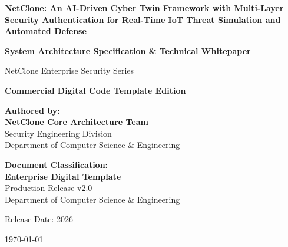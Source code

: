 \documentclass[12pt,a4paper]{report}
\begin{document}
\begin{titlepage}
    \centering
    \vspace*{0.5cm}
    
    {\Huge \textbf{NetClone: An AI-Driven Cyber Twin Framework with Multi-Layer Security Authentication for Real-Time IoT Threat Simulation and Automated Defense}}\par
    \vspace{1.2cm}
    
    {\Large \textbf{System Architecture Specification \& Technical Whitepaper}}\par
    \vspace{0.4cm}
    {\large NetClone Enterprise Security Series}\par
    {\large \textbf{Commercial Digital Code Template Edition}}\par
    \vspace{1.8cm}
    
    \begin{minipage}{0.48\textwidth}
        \begin{flushleft} \large
            \textbf{Authored by:}\\
            \textbf{NetClone Core Architecture Team}\\
            Security Engineering Division\\
            Department of Computer Science \& Engineering
        \end{flushleft}
    \end{minipage}
    \hfill
    \begin{minipage}{0.48\textwidth}
        \begin{flushright} \large
            \textbf{Document Classification:}\\
            \textbf{Enterprise Digital Template}\\
            Production Release v2.0\\
            Department of Computer Science \& Engineering
        \end{flushright}
    \end{minipage}
    
    \vfill
    {\large Release Date: 2026}\par
    \vspace{0.4cm}
    {\large \today}\par
\end{titlepage}
\end{document}
